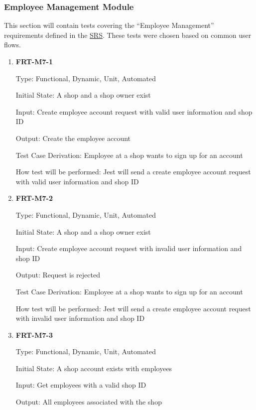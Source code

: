 \documentclass[12pt, titlepage]{article}
\begin{document}
\subsubsection{Employee Management Module}

This section will contain tests covering the ``Employee Management'' requirements defined in the
\href{https://github.com/arkinmodi/project-sayyara/blob/main/docs/SRS/SRS.pdf}{SRS}. These tests
were chosen based on common user flows.

\begin{enumerate}

	\item \textbf{FRT-M7-1}

	      Type: Functional, Dynamic, Unit, Automated

	      Initial State: A shop and a shop owner exist

	      Input: Create employee account request with valid user information and shop ID

	      Output: Create the employee account

	      Test Case Derivation: Employee at a shop wants to sign up for an account

	      How test will be performed: Jest will send a create employee account request with valid user
	      information and shop ID

	\item \textbf{FRT-M7-2}

	      Type: Functional, Dynamic, Unit, Automated

	      Initial State: A shop and a shop owner exist

	      Input: Create employee account request with invalid user information and shop ID

	      Output: Request is rejected

	      Test Case Derivation: Employee at a shop wants to sign up for an account

	      How test will be performed: Jest will send a create employee account request with invalid user
	      information and shop ID

	\item \textbf{FRT-M7-3}

	      Type: Functional, Dynamic, Unit, Automated

	      Initial State: A shop account exists with employees

	      Input: Get employees with a valid shop ID

	      Output: All employees associated with the shop


\end{enumerate}
\end{document}
